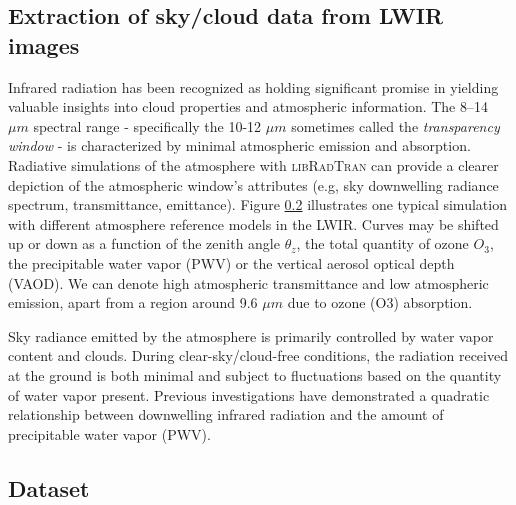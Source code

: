 \documentclass[remotesensing,article,submit,pdftex,moreauthors]{Definitions/mdpi}
\begin{document}
\subsection{Extraction of sky/cloud data from LWIR images}

Infrared radiation has been recognized as holding significant promise in yielding valuable insights into cloud properties and atmospheric information. The 8–14 $\mu m$ spectral range - specifically the 10-12 $\mu m$ sometimes called the \textit{transparency window} - is characterized by minimal atmospheric emission and absorption. Radiative simulations of the atmosphere with \textsc{libRadTran} can provide a clearer depiction of the atmospheric window's attributes (e.g, sky downwelling radiance spectrum, transmittance, emittance). Figure \ref{} illustrates one typical simulation with different atmosphere reference models in the LWIR. Curves may be shifted up or down as a function of the zenith angle $\theta_{z}$, the total quantity of ozone $O_{3}$, the precipitable water vapor (PWV) or the vertical aerosol optical depth (VAOD). We can denote high atmospheric transmittance and low atmospheric emission, apart from a region around 9.6 $\mu m$ due to ozone (O3) absorption.

Sky radiance emitted by the atmosphere is primarily controlled by water vapor content and clouds. During clear-sky/cloud-free conditions, the radiation received at the ground is both minimal and subject to fluctuations based on the quantity of water vapor present. Previous investigations have demonstrated a quadratic relationship between downwelling infrared radiation and the amount of precipitable water vapor (PWV). 

\subsection{Dataset}
\end{document}
